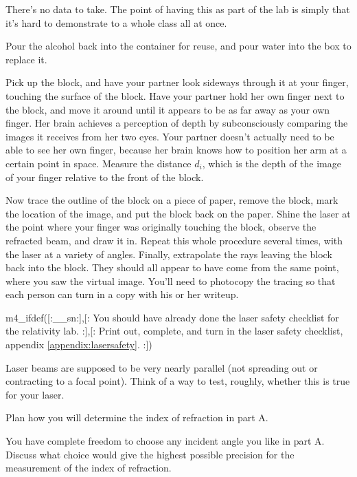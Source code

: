 There's no data
to take.
The point of having this as part of the lab is simply that
it's hard to demonstrate to a whole class all at once.


Pour the alcohol back into the container for reuse, and pour water
into the box to replace it.

Pick up the block, and have your partner look sideways
through it at your finger, touching the surface of the
block. Have your partner hold her own finger next to the
block, and move it around until it appears to be as far away
as your own finger. Her brain achieves a perception of
depth by subconsciously comparing the images it receives
from her two eyes. Your partner doesn't actually need to be
able to see her own finger, because her brain knows how to
position her arm at a certain point in space.
 Measure the distance $d_i$, which is
the depth of the image of your finger relative to the front of the block.



Now trace the outline of the block on a piece of paper,
remove the block, mark the location of the image, and put
the block back on the paper. Shine the laser at the point
where your finger was originally touching the block, observe
the refracted beam, and draw it in. Repeat this whole
procedure several times, with the laser at a variety of
angles. Finally, extrapolate the rays leaving the block back
into the block. They should all appear to have come from the
same point, where you saw the virtual image. You'll need to
photocopy the tracing so that each person can turn in a copy
with his or her writeup.

\prelab

m4_ifdef([:__sn:],[:%
You should have already done the laser safety checklist for the relativity lab.
:],[:
Print out, complete, and turn in the laser safety checklist, appendix \ref{appendix:lasersafety}.
:])

\prelabquestion  Laser beams are supposed to be very nearly parallel (not
spreading out or contracting to a focal point). Think of a
way to test, roughly, whether this is true for your laser.

\prelabquestion  Plan how you will determine the index of refraction in part A.

\prelabquestion  You have complete freedom to choose any incident angle you
like in part A. Discuss what choice would give the highest possible precision
for the measurement of the index of refraction.

